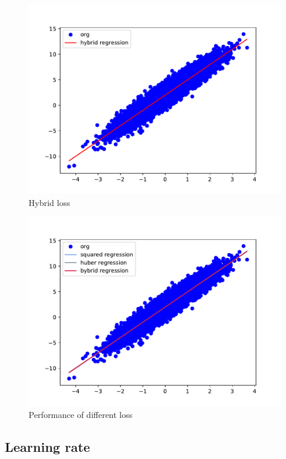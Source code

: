 \documentclass{article}
\begin{document}
\begin{figure}
  \centering
  \includegraphics[scale=0.5]{imgs/hybrid.pdf}
  \caption{Hybrid loss}
  \label{hybrid_loss}
\end{figure}

\begin{figure}
  \centering
  \includegraphics[scale=0.5]{imgs/all.pdf}
  \caption{Performance of different loss}
  \label{all_loss}
\end{figure}


\subsection{Learning rate}
\end{document}
